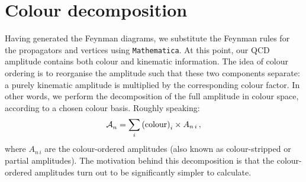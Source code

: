 \documentclass[main.tex]{subfiles}
\begin{document}
\section{Colour decomposition} \label{sec:colourdec}
Having generated the Feynman diagrams, we substitute the Feynman rules for the propagators and vertices using \texttt{Mathematica}. At this point, our QCD amplitude contains both colour and kinematic information. The idea of colour ordering is to reorganise the amplitude such that these two components separate: a purely kinematic amplitude is multiplied by the corresponding colour factor. In other words, we perform the decomposition of the full amplitude in colour space, according to a chosen colour basis. Roughly speaking:
\begin{equation}
    \mathcal{A}_{n}^{} = \sum_i \text{(colour)}_i \times A_{n\,i} \,, 
\end{equation}
where $A_{n\,i}$ are the colour-ordered amplitudes (also known as colour-stripped or partial amplitudes). The motivation behind this decomposition is that the colour-ordered amplitudes turn out to be significantly simpler to calculate.
\end{document}
